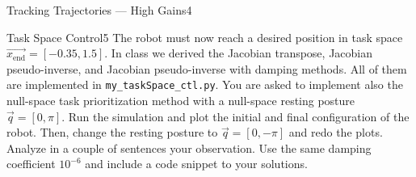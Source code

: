 \begin{questions}
\begin{question}{Tracking Trajectories --- High Gains}{4}
\begin{answer}
\end{answer}
		
	\end{question}
	
	
	\begin{question}[bonus]{Task Space Control}{5}
		The robot must now reach a desired position in task space $\vec{x_\textrm{end}}={[-0.35,1.5]}$. In class we derived the Jacobian transpose, Jacobian pseudo-inverse, and Jacobian pseudo-inverse with damping methods. All of them are implemented in \texttt{my\_taskSpace\_ctl.py}. You are asked to implement also the null-space task prioritization method with a null-space resting posture $\vec q=[0,\pi]$. Run the simulation and plot the initial and final configuration of the robot. Then, change the resting posture to $\vec q=[0,-\pi]$ and redo the plots. Analyze in a couple of sentences your observation. Use the same damping coefficient $10^{-6}$ and include a code snippet to your solutions.
		
\begin{answer}
\end{answer}
		
	\end{question}
	
\end{questions}

